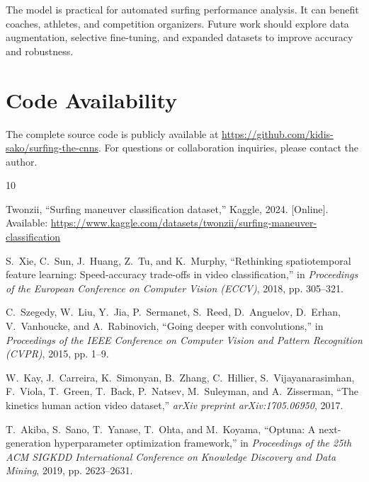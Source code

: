 \documentclass[11pt, journal]{IEEEtran}
\begin{document}
The model is practical for automated surfing performance analysis. It can benefit coaches, athletes, and competition organizers. Future work should explore data augmentation, selective fine-tuning, and expanded datasets to improve accuracy and robustness.

\section*{Code Availability}

The complete source code is publicly available at \url{https://github.com/kidis-sako/surfing-the-cnns}. For questions or collaboration inquiries, please contact the author.


\begin{thebibliography}{10}

Twonzii,
``Surfing maneuver classification dataset,''
Kaggle, 2024. [Online]. Available: \url{https://www.kaggle.com/datasets/twonzii/surfing-maneuver-classification}

S.~Xie, C.~Sun, J.~Huang, Z.~Tu, and K.~Murphy,
``Rethinking spatiotemporal feature learning: Speed-accuracy trade-offs in video classification,''
in \emph{Proceedings of the European Conference on Computer Vision (ECCV)}, 2018, pp. 305--321.

C.~Szegedy, W.~Liu, Y.~Jia, P.~Sermanet, S.~Reed, D.~Anguelov, D.~Erhan, V.~Vanhoucke, and A.~Rabinovich,
``Going deeper with convolutions,''
in \emph{Proceedings of the IEEE Conference on Computer Vision and Pattern Recognition (CVPR)}, 2015, pp. 1--9.

W.~Kay, J.~Carreira, K.~Simonyan, B.~Zhang, C.~Hillier, S.~Vijayanarasimhan, F.~Viola, T.~Green, T.~Back, P.~Natsev, M.~Suleyman, and A.~Zisserman,
``The kinetics human action video dataset,''
\emph{arXiv preprint arXiv:1705.06950}, 2017.

T.~Akiba, S.~Sano, T.~Yanase, T.~Ohta, and M.~Koyama,
``Optuna: A next-generation hyperparameter optimization framework,''
in \emph{Proceedings of the 25th ACM SIGKDD International Conference on Knowledge Discovery and Data Mining}, 2019, pp. 2623--2631.

\end{thebibliography}
\end{document}
